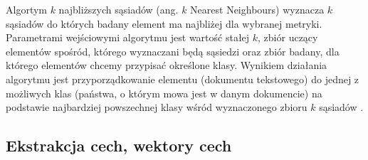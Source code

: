 \documentclass{classrep}
\begin{document}
Algortym $k$ najbliższych sąsiadów (ang. $k$ Nearest Neighbours) wyznacza $k$ sąsiadów 
do których badany element ma najbliżej dla wybranej metryki. Parametrami wejściowymi algorytmu jest wartość stałej $k$, zbiór uczący elementów spośród, którego wyznaczani będą sąsiedzi oraz zbiór badany, dla którego elementów chcemy przypisać określone klasy. Wynikiem działania algorytmu jest przyporządkowanie elementu (dokumentu tekstowego) do jednej z możliwych klas (państwa, o którym mowa jest w danym dokumencie) na podstawie najbardziej powszechnej klasy wśród wyznaczonego zbioru $k$ sąsiadów \cite{tadeusiewicz90}.

\subsection{Ekstrakcja cech, wektory cech}
\end{document}
